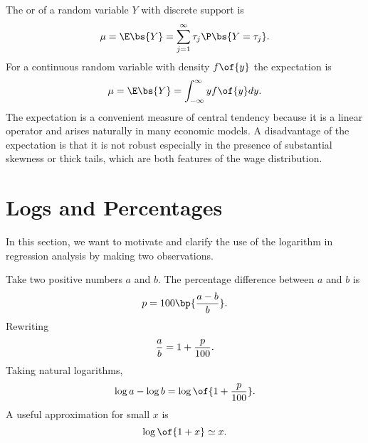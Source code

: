 The  or  of a random variable $Y$ with discrete support is 
\begin{equation}
    \notag 
    \mu = \E\bs{Y} = \sum_{j=1}^{\infty} \tau_j \P\bs{Y = \tau_j}.
\end{equation}
For a continuous random variable with density $f\of{y}$ the expectation is 
\begin{equation}
    \notag 
    \mu = \E\bs{Y} = \int_{-\infty}^{\infty} y f\of{y} dy.
\end{equation}
The expectation is a convenient measure of central tendency because it is a linear operator and arises naturally in many economic models. A disadvantage of the expectation is that it is not robust especially in the presence of substantial skewness or thick tails, which are both features of the wage distribution.


\setcounter{section}{3}

\section{Logs and Percentages}

In this section, we want to motivate and clarify the use of the logarithm in regression analysis by making two observations. 

Take two positive numbers $a$ and $b$. The percentage difference between $a$ and $b$ is $$p = 100\bp{\frac{a-b}{b}}.$$ Rewriting 
\begin{equation}
    \notag 
    \frac{a}{b} = 1 + \frac{p}{100}.
\end{equation}
Taking natural logarithms, 
\setcounter{equation}{1}
\begin{equation}
    \label{hansen_eq_2_2}
    \log a - \log b = \log\of{1 + \frac{p}{100}}.
\end{equation}
A useful approximation for small $x$ is 
\begin{equation}
    \label{hansen_eq_2_3}
    \log\of{1+x} \simeq x.
\end{equation}

